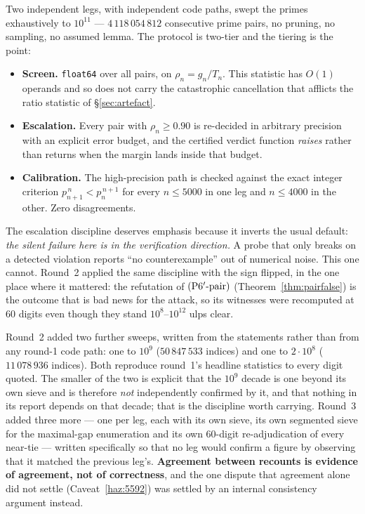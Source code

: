 \documentclass[11pt,a4paper]{article}
\theoremstyle{plain}
\theoremstyle{definition}
\theoremstyle{remark}
\newcommand{\Ppair}{\textup{(P6$'$-pair)}}
\begin{document}
Two independent legs, with independent code paths, swept the primes exhaustively to $10^{11}$
--- $4\,118\,054\,812$ consecutive prime pairs, no pruning, no sampling, no assumed lemma.
The protocol is two-tier and the tiering is the point:

\begin{itemize}
\item \textbf{Screen.} \texttt{float64} over all pairs, on $\rho_n = g_n/T_n$. This statistic
  has $O(1)$ operands and so does not carry the catastrophic cancellation that afflicts the
  ratio statistic of \S\ref{sec:artefact}.
\item \textbf{Escalation.} Every pair with $\rho_n \ge 0.90$ is re-decided in arbitrary
  precision with an explicit error budget, and the certified verdict function \emph{raises}
  rather than returns when the margin lands inside that budget.
\item \textbf{Calibration.} The high-precision path is checked against the exact integer
  criterion $p_{n+1}^{\,n} < p_n^{\,n+1}$ for every $n \le 5000$ in one leg and $n \le 4000$
  in the other. Zero disagreements.
\end{itemize}

The escalation discipline deserves emphasis because it inverts the usual default:
\emph{the silent failure here is in the verification direction.} A probe that only breaks on
a detected violation reports ``no counterexample'' out of numerical noise. This one cannot.
Round~2 applied the same discipline with the sign flipped, in the one place where it mattered:
the refutation of $\Ppair$ (Theorem~\ref{thm:pairfalse}) is the outcome that is bad news for the
attack, so its witnesses were recomputed at 60 digits even though they stand
$10^{8}$--$10^{12}$ ulps clear.

Round~2 added two further sweeps, written from the statements rather than from any round-1 code
path: one to $10^9$ ($50\,847\,533$ indices) and one to $2\cdot10^8$ ($11\,078\,936$ indices).
Both reproduce round~1's headline statistics to every digit quoted. The smaller of the two is
explicit that the $10^9$ decade is one beyond its own sieve and is therefore \emph{not}
independently confirmed by it, and that nothing in its report depends on that decade; that is
the discipline worth carrying. Round~3 added three more --- one per leg, each with its own
sieve, its own segmented sieve for the maximal-gap enumeration and its own $60$-digit
re-adjudication of every near-tie --- written specifically so that no leg would confirm a
figure by observing that it matched the previous leg's. \textbf{Agreement between recounts is
evidence of agreement, not of correctness}, and the one dispute that agreement alone did not
settle (Caveat~\ref{haz:5592}) was settled by an internal consistency argument instead.
\end{document}
